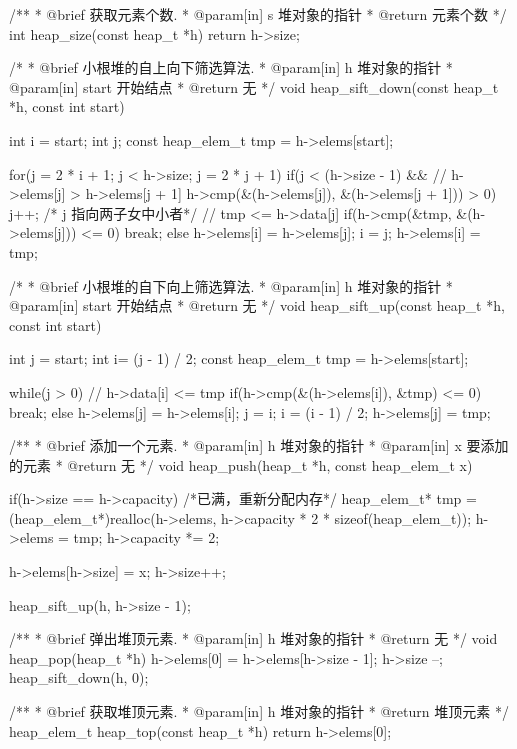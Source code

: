 \begin{Codex}[label=heap.c]
/** 
 * @brief 获取元素个数.
 * @param[in] s 堆对象的指针
 * @return 元素个数
 */
int heap_size(const heap_t *h) {
    return h->size;
}

/*
 * @brief 小根堆的自上向下筛选算法.
 * @param[in] h 堆对象的指针
 * @param[in] start 开始结点
 * @return 无
 */
void heap_sift_down(const heap_t *h, const int start) {
    int i = start;
    int j;
    const heap_elem_t tmp = h->elems[start];
       
    for(j = 2 * i + 1; j < h->size; j = 2 * j + 1) {
        if(j < (h->size - 1) && 
            // h->elems[j] > h->elems[j + 1]
            h->cmp(&(h->elems[j]), &(h->elems[j + 1])) > 0) {
                j++; /* j 指向两子女中小者*/
        }
        // tmp <= h->data[j]
        if(h->cmp(&tmp, &(h->elems[j])) <= 0) {
            break;
        } else {
            h->elems[i] = h->elems[j];
            i = j;
        }
    }
    h->elems[i] = tmp;
}
 
/* 
 * @brief 小根堆的自下向上筛选算法.
 * @param[in] h 堆对象的指针
 * @param[in] start 开始结点
 * @return 无
 */
void heap_sift_up(const heap_t *h, const int start) {
    int j = start;
    int i= (j - 1) / 2;
    const heap_elem_t tmp = h->elems[start];
 
    while(j > 0) {
        // h->data[i] <= tmp
        if(h->cmp(&(h->elems[i]), &tmp) <= 0) {
            break;
        } else {
            h->elems[j] = h->elems[i];
            j = i;
            i = (i - 1) / 2;
        }
    }
    h->elems[j] = tmp;
}

/** 
 * @brief 添加一个元素.
 * @param[in] h 堆对象的指针
 * @param[in] x 要添加的元素
 * @return 无
 */
void heap_push(heap_t *h, const heap_elem_t x) {
    if(h->size == h->capacity) { /*已满，重新分配内存*/
        heap_elem_t* tmp = 
            (heap_elem_t*)realloc(h->elems, h->capacity * 2 * sizeof(heap_elem_t));
        h->elems = tmp;
        h->capacity *= 2;
    }
 
    h->elems[h->size] = x;
    h->size++;

    heap_sift_up(h, h->size - 1);
}

/** 
 * @brief 弹出堆顶元素.
 * @param[in] h 堆对象的指针
 * @return 无
 */
void heap_pop(heap_t *h) {
    h->elems[0] = h->elems[h->size - 1];
    h->size --;
    heap_sift_down(h, 0);
}

/** 
 * @brief 获取堆顶元素.
 * @param[in] h 堆对象的指针
 * @return 堆顶元素
 */
heap_elem_t heap_top(const heap_t *h) {
    return h->elems[0];
}
\end{Codex}